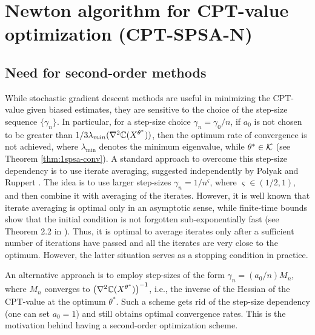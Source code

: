 \documentclass{article}
\numberwithin{equation}{section}
\numberwithin{theorem}{section}
\begin{document}
\newpage
\section{Newton algorithm for CPT-value optimization (CPT-SPSA-N)}
\label{sec:2spsa}
\subsection{Need for second-order methods}
While stochastic gradient descent methods are useful in minimizing the CPT-value given biased estimates, they are sensitive to the choice of the step-size sequence $\{\gamma_n\}$.  In particular, for a step-size choice $\gamma_n = \gamma_0/n$, if $a_0$ is not chosen to be greater than $1/3 \lambda_{min}(\nabla^2 \mathbb{C}(X^{\theta^*}))$, then the optimum rate of convergence is not achieved, where $\lambda_{\min}$ denotes the minimum eigenvalue, while $\theta^*\in \mathcal{K}$ (see Theorem \ref{thm:1spsa-conv}). A standard approach to overcome this step-size dependency is to use iterate averaging, suggested independently by Polyak \cite{polyak1992acceleration} and Ruppert \cite{ruppert1991stochastic}. The idea is to use larger step-sizes $\gamma_n = 1/n^\varsigma$, where $\varsigma \in (1/2,1)$, and then combine it with averaging of the iterates. However, it is well known  that iterate averaging is optimal only in an asymptotic sense, while finite-time bounds show that the initial condition is not forgotten sub-exponentially fast (see 
Theorem 2.2 in \cite{fathi2013transport}). Thus, it is optimal to average iterates only 
after a sufficient number of iterations have passed and all the iterates are very close to the optimum. However, the latter situation serves as a stopping condition in practice.

An alternative approach is to employ step-sizes of the form $\gamma_n = (a_0/n) M_n$, where $M_n$ converges to $\left(\nabla^2 \mathbb{C}(X^{\theta^*})\right)^{-1}$, i.e., the inverse of the Hessian of the CPT-value at the optimum $\theta^*$. Such a scheme gets rid of the step-size dependency (one can set $a_0=1$) and still obtains optimal convergence rates. This is the motivation behind having a second-order optimization scheme.
\end{document}
